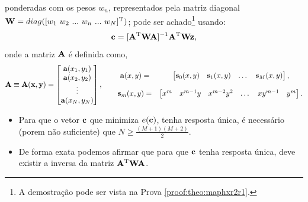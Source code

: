 \begin{theorem}
ponderadas com os pesos $w_n$, 
representados pela matriz diagonal $\MATRIX{W}=\funcdiag([w_1~ w_2~ ...~ w_n~ ...~ w_N]^{\transpose})$;
pode ser achado\footnote{A demostração pode ser vista na Prova \ref{proof:theo:maphxr2r1}.} usando:
\begin{equation}\label{eq:maphxr2r1:3}
\VECTOR{c}=[\MATRIX{A}^{\transpose}\MATRIX{W}\MATRIX{A}]^{-1}\MATRIX{A}^{\transpose}\MATRIX{W}\VECTOR{z},
\end{equation}
onde a matriz $\MATRIX{A}$ é definida como,
\begin{equation}\label{eq:maphxr2r1:4}
\MATRIX{A}\equiv\MATRIX{A}(\VECTOR{x},\VECTOR{y})=\begin{bmatrix}
\VECTOR{a}(x_1,y_1)\\
\VECTOR{a}(x_2,y_2)\\
\vdots\\
\VECTOR{a}(x_N,y_N)\\
\end{bmatrix}, \qquad
\begin{matrix}
\VECTOR{a}(x,y)= &
\begin{bmatrix}
\VECTOR{s}_{0}(x,y) & \VECTOR{s}_{1}(x,y) &  \dots  & \VECTOR{s}_{M}(x,y)
\end{bmatrix},\\
~&~\\
\VECTOR{s}_{m}(x,y)=&
\begin{bmatrix}
x^m  & x^{m-1} y  & x^{m-2} y^2    & \dots  & x y^{m-1} &  y^m 
\end{bmatrix}.
\end{matrix}
\end{equation}
\end{theorem}


\begin{tcbattention}
\begin{itemize}
\item Para que o vetor $\VECTOR{c}$
que minimiza $e(\VECTOR{c})$, tenha resposta única,
é necessário (porem não suficiente) que  $N\geq \frac{(M+1)(M+2)}{2}$.
\item De forma exata podemos afirmar que para que $\VECTOR{c}$ tenha resposta única,
deve existir a inversa da matriz $\MATRIX{A}^{\transpose}\MATRIX{W}\MATRIX{A}$.
\end{itemize}
\end{tcbattention}


